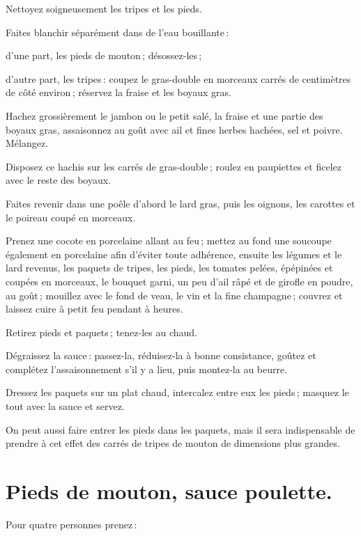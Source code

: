 Nettoyez soigneusement les tripes et les pieds.

Faites blanchir séparément dans de l'eau bouillante :

d'une part, les pieds de mouton ; désossez-les ;

d'autre part, les tripes : coupez le gras-double en morceaux carrés de
{\mmm} centimètres de côté environ ; réservez la fraise et les boyaux gras.

Hachez grossièrement le jambon ou le petit salé, la fraise et une partie des
boyaux gras, assaisonnez au goût avec ail et fines herbes hachées, sel et
poivre. Mélangez.

Disposez ce hachis sur les carrés de gras-double ; roulez en paupiettes et
ficelez avec le reste des boyaux.

Faites revenir dans une poêle d'abord le lard gras, puis les oignons, les carottes
et le poireau coupé en morceaux.

Prenez une cocote en porcelaine allant au feu ; mettez au fond une soucoupe
également en porcelaine afin d'éviter toute adhérence, ensuite les légumes et
le lard revenus, les paquets de tripes, les pieds, les tomates pelées,
épépinées et coupées en morceaux, le bouquet garni, un peu d'ail râpé et de
girofle en poudre, au goût ; mouillez avec le fond de veau, le vin et la fine
champagne ; couvrez et laissez cuire à petit feu pendant {\mmm}
à {\mmm} heures.

Retirez pieds et paquets ; tenez-les au chaud.

Dégraissez la sauce : passez-la, réduisez-la à bonne consistance, goûtez et
complétez l’assaisonnement s'il y a lieu, puis montez-la au beurre.

Dressez les paquets sur un plat chaud, intercalez entre eux les pieds ; masquez
le tout avec la sauce et servez.

\sk

On peut aussi faire entrer les pieds dans les paquets, mais il sera
indispensable de prendre à cet effet des carrés de tripes de mouton de
dimensions plus grandes.

\newpage
\section*{\centering Pieds de mouton, sauce poulette.}
{}
\label{pg0445} \hypertarget{p0445}{}

Pour quatre personnes prenez :

